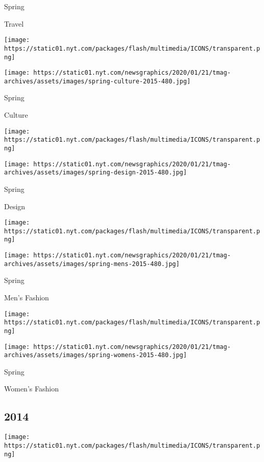 Spring

Travel

\href{https://www.nytimes.com/indexes/2015/04/12/t-magazine/design-issue/index.html}{}

\texttt{[image: https://static01.nyt.com/packages/flash/multimedia/ICONS/transparent.png]}

\texttt{[image: https://static01.nyt.com/newsgraphics/2020/01/21/tmag-archives/assets/images/spring-culture-2015-480.jpg]}

Spring

Culture

\href{https://www.nytimes.com/indexes/2015/03/29/t-magazine/design-issue/index.html}{}

\texttt{[image: https://static01.nyt.com/packages/flash/multimedia/ICONS/transparent.png]}

\texttt{[image: https://static01.nyt.com/newsgraphics/2020/01/21/tmag-archives/assets/images/spring-design-2015-480.jpg]}

Spring

Design

\href{https://www.nytimes.com/indexes/2015/03/08/t-magazine/mens-fashion-issue/index.html}{}

\texttt{[image: https://static01.nyt.com/packages/flash/multimedia/ICONS/transparent.png]}

\texttt{[image: https://static01.nyt.com/newsgraphics/2020/01/21/tmag-archives/assets/images/spring-mens-2015-480.jpg]}

Spring

Men's Fashion

\href{https://www.nytimes.com/indexes/2015/02/15/t-magazine/womens-fashion-issue/index.html}{}

\texttt{[image: https://static01.nyt.com/packages/flash/multimedia/ICONS/transparent.png]}

\texttt{[image: https://static01.nyt.com/newsgraphics/2020/01/21/tmag-archives/assets/images/spring-womens-2015-480.jpg]}

Spring

Women's Fashion

\hypertarget{2014}{%
\subsection{2014}\label{2014}}

\href{https://www.nytimes.com/indexes/2014/12/07/t-magazine/design-issue/index.html}{}

\texttt{[image: https://static01.nyt.com/packages/flash/multimedia/ICONS/transparent.png]}

